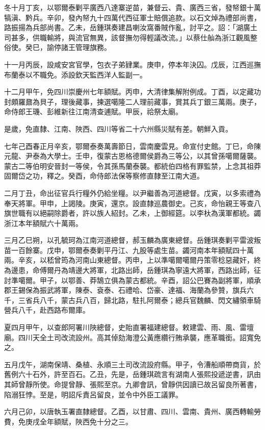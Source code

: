 \begin{pinyinscope}
冬十月丁亥，以鄂爾泰剿平廣西八達寨逆苗，兼督云、貴、廣西三省，發帑銀十萬犒滇、黔兵。辛卯，發內帑九十四萬代西征軍士賠償追款。以石文焯為禮部尚書，路振揚為兵部尚書。乙未，岳鍾琪奏建昌喇汝窩番賊作亂，討平之。詔：「湖廣土司甚多，供職輸將，與流官無異，該督撫勿得輕議改流。」以蔡仕舢為浙江觀風整俗使。癸巳，諭停諸王管理旗務。

十一月丙辰，設咸安宮官學，包衣子弟肄業。庚申，停本年決囚。戊辰，江西巡撫布蘭泰以不職免。添設欽天監西洋人監副一。

十二月甲午，免四川崇慶州七年額賦。丙申，大清律集解附例成。丁酉，以定藏功封頗羅鼐為貝子，理後藏事，揀選噶隆二人理前藏事，賞其兵丁銀三萬兩。庚子，命侍郎王璣、彭維新往江南清查逋賦。甲辰，祫祭太廟。

是歲，免直隸、江南、陜西、四川等省二十六州縣災賦有差。朝鮮入貢。

七年己酉春正月辛亥，鄂爾泰奏萬壽節日，雲南慶雲見。命宣付史館。丁巳，命陳元龍、尹泰為大學士。壬申，復蒙古恩格德爾侯爵為三等公，以其曾孫噶爾薩襲。蒙古二等伯明安晉封一等侯，令其孫馬蘭泰襲。都統伯四格有罪監禁，上念其祖莽固爾岱之功，釋之。癸酉，命侍郎法保等察修直隸至江南大道。

二月丁丑，命出征官兵行糧外仍給坐糧。以尹繼善為河道總督。戊寅，以多索禮為奉天將軍。甲申，上謁陵。庚寅，還京。設直隸巡農御史。己亥，命怡親王等查八旗世職有以絕嗣除爵者，許以族人紹封。乙未，上御經筵。以李杕為漢軍都統。蠲浙江本年額賦六十萬兩。

三月乙巳朔，以孔毓珂為江南河道總督，郝玉麟為廣東總督。岳鍾琪奏剿平雷波叛苗一百餘寨。戊申，鄂爾泰奏剿平丹江、九股等處生苗。蠲河南本年額賦四十萬兩。辛亥，以嵇曾筠為河南山東總督。丙申，上以準噶爾噶爾丹策零稔惡藏奸，終為邊患，命傅爾丹為靖邊大將軍，北路出師，岳鍾琪為寧遠大將軍，西路出師，征討準噶爾。甲子，以鄂善、莽鵠立俱為蒙古都統。辛酉，詔公巴賽為副將軍，順承郡王錫保為振武將軍，陳泰、袞泰、石禮哈、岱豪、達福、海蘭為參贊，旗兵六千，三省兵八千，蒙古兵八百，歸北路，駐扎阿爾泰；總兵官魏麟、閃文繡領車騎營兵八千，赴西路布爾庫。

夏四月甲午，以查郎阿署川陜總督，史貽直署福建總督。敕建雲、雨、風、雷壇廟。四川天全土司改流設州。高其倬劾海澄公黃應纘行賄承襲，應革職銜。詔寬免之。

五月戊午，湖南保靖、桑植、永順三土司改流設府縣。甲子，令漕船順帶商貨，於舊例六十石外，許至百石。乙丑，先是，岳鍾琪疏言有湖南人張熙投遞逆書，訊由其師曾靜所使。命提曾靜、張熙至京。九卿會訊，曾靜供因讀已故呂留良所著書，陷溺狂悖。至是，明詔斥責呂留良，並令中外臣工議罪。

六月己卯，以唐執玉署直隸總督。乙酉，以甘肅、四川、雲南、貴州、廣西轉輸勞費，免庚戌全年額賦，陜西免十分之三。


\end{pinyinscope}
